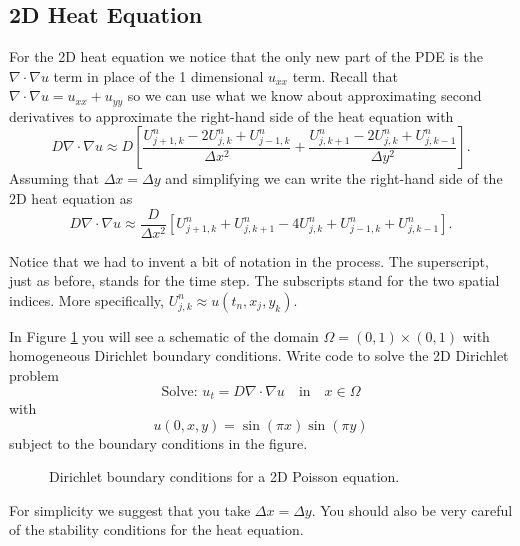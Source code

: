\subsection{2D Heat Equation}
For the 2D heat equation we notice that the only new part of the PDE is the $\nabla \cdot
\nabla u$ term in place of the 1 dimensional $u_{xx}$ term.  Recall that $\nabla \cdot
\nabla u = u_{xx} + u_{yy}$ so we can use what we know about approximating second
derivatives to approximate the right-hand side of the heat equation with
\[ D \nabla \cdot \nabla u \approx D \left[ \frac{U^n_{j+1,k} - 2U^n_{j,k}
+ U^n_{j-1,k} }{\Delta x^2} + \frac{U^n_{j,k+1} - 2U^n_{j,k} + U^n_{j,k-1} }{\Delta y^2}
\right]. \]
Assuming that $\Delta x = \Delta y$ and simplifying we can write the right-hand side of
the 2D heat equation as
\[ D \nabla \cdot \nabla u \approx \frac{D}{\Delta x^2} \left[  U^n_{j+1,k} + U^n_{j,k+1} - 4U^n_{j,k}
+ U^n_{j-1,k} + U^n_{j,k-1} \right]. \]

Notice that we had to invent a bit of notation in the process.  The superscript, just as
before, stands for the time step.  The subscripts stand for the two spatial indices.  More
specifically, $U^{n}_{j,k} \approx u(t_n, x_j, y_k)$.

\begin{problem}
    In Figure \ref{fig:2DHeat_BC} you will see a schematic of the domain
    $\Omega=(0,1)\times (0,1)$ with homogeneous Dirichlet boundary conditions.  Write code
    to solve the 2D Dirichlet problem
    \[ \text{Solve: } u_t = D \nabla \cdot \nabla u  \quad \text{in} \quad x \in
    \Omega \]
    with
    \[ u(0,x,y) = \sin(\pi x)\sin(\pi y) \]
    subject to the boundary conditions in the figure.

    \begin{figure}[ht!]
        \centering
        \caption{Dirichlet boundary conditions for a 2D Poisson equation.}
        \label{fig:2DHeat_BC}
    \end{figure}
    For simplicity we suggest that you take $\Delta x = \Delta y$.  You should also be
    very careful of the stability conditions for the heat equation.  
\end{problem}


